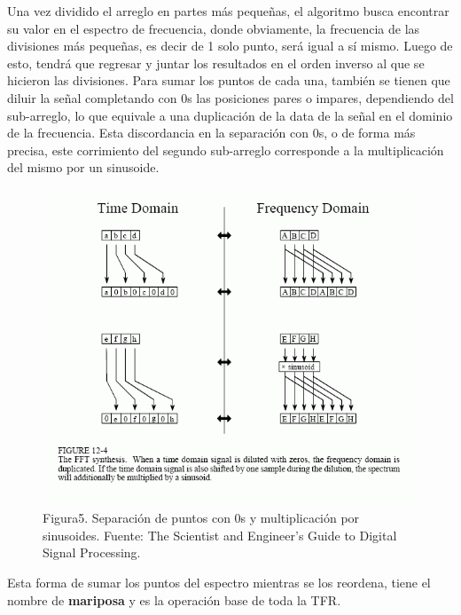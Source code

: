\documentclass[review,1p]{elsarticle}
\begin{document}
Una vez dividido el arreglo en partes más pequeñas, el algoritmo busca encontrar su valor en el espectro de frecuencia, donde obviamente, la frecuencia de las divisiones más pequeñas, es decir de 1 solo punto, será igual a sí mismo. Luego de esto, tendrá que regresar y juntar los resultados en el orden inverso al que se hicieron las divisiones. Para sumar los puntos de cada una, también se tienen que diluir la señal completando con 0s las posiciones pares o impares, dependiendo del sub-arreglo, lo que equivale a una duplicación de la data de la señal en el dominio de la frecuencia. Esta discordancia en la separación con 0s, o de forma más precisa, este corrimiento del segundo sub-arreglo corresponde a la multiplicación del mismo por un sinusoide. 
\clearpage
\begin{figure}[h!]
    \centering
    \includegraphics[scale=0.9]{Figuras/F_12_4.png}
    \\
    \small Figura5. Separación de puntos con 0s y multiplicación por sinusoides. Fuente: The Scientist and Engineer's Guide to Digital Signal Processing.
\end{figure}
Esta forma de sumar los puntos del espectro mientras se los reordena, tiene el nombre de \textbf{mariposa} y es la operación base de toda la TFR. \\
\end{document}
